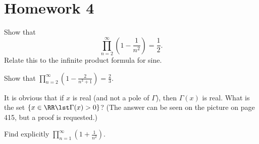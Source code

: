\section*{Homework 4}\renewcommand{\leftmark}{Homework 4}
\begin{exercise}
Show that 
$$\displaystyle\prod^{\infty}_{n=2}\left(1-\frac{1}{n^{2}}\right)=\frac{1}{2}.$$
Relate this to the infinite product formula for sine.
\end{exercise}
\begin{exercise}
Show that $\displaystyle\prod^{\infty}_{n=2}\left(1-\frac{2}{n^{3}+1}\right)=\frac{2}{3}$.
\end{exercise}
\begin{exercise}
It is obvious that if $x$ is real (and not a pole of $\Gamma$),
then $\Gamma(x)$ is real. What is the set $\{x \in\RR \lst
\Gamma(x) > 0\}$? (The answer can be seen on the picture on page
415, but a proof is requested.) 
\end{exercise}
\begin{exercise}
Find explicitly
$\displaystyle\prod^{\infty}_{n=1}\left(1+\frac{1}{n^{2}}\right).$
\end{exercise}

